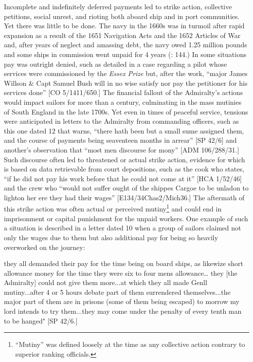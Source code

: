 Incomplete and indefinitely deferred payments led to strike action, collective petitions, social unrest, and rioting both aboard ship and in port communities. Yet there was little to be done. The navy in the 1660s was in turmoil after rapid expansion as a result of the 1651 Navigation Acts and the 1652 Articles of War and, after years of neglect and amassing debt, the navy owed 1.25 million pounds and some ships in commission went unpaid for 4 years (\citealt{Lincoln2015}: 144.) In some situations pay was outright denied, such as detailed in a case regarding a pilot whose services were commissioned by the \textit{Essex Prize} but, after the work, “major James Willson \& Capt Samuel Bush will in no wise satisfy nor pay the petitioner for his services done” [CO 5/1411/650.] The financial fallout of the Admiralty’s actions would impact sailors for more than a century, culminating in the mass mutinies of South England in the late 1700s. Yet even in times of peaceful service, tensions were anticipated in letters to the Admiralty from commanding officers, such as this one dated 12 \citealt{March1700} that warns, “there hath been but a small sume assigned them, and the course of payments being seaventeen months in arrear” [SP 42/6] and another’s observation that “most men discourse for mony” [ADM 106/288/31.] Such discourse often led to threatened or actual strike action, evidence for which is based on data retrievable from court depositions, such as the cook who states, “if he did not pay his work before that he could not come at it” [HCA 1/52/46] and the crew who “would not suffer ought of the shippes Cargoe to be unladon to lighton her ere they had their wages” [E134/34Chas2/Mich36.] The aftermath of this strike action was often actual or perceived mutiny\footnote{“Mutiny” was defined loosely at the time as any collective action contrary to superior ranking officials.} and could end in imprisonment or capital punishment for the unpaid workers. One example of such a situation is described in a letter dated 10 \citealt{December1700} when a group of sailors claimed not only the wages due to them but also additional pay for being so heavily overworked on the journey:

they all demanded their pay for the time being on board ships, as likewize short allowance money for the time they were six to four mens allowance… they [the Admiralty] could not give them more...at which they all made Genll mutiny...after 4 or 5 hours debate part of them surrendered themselves...the major part of them are in prisons (some of them being escaped) to morrow my lord intends to try them...they may come under the penalty of every tenth man to be hanged" [SP 42/6.]

